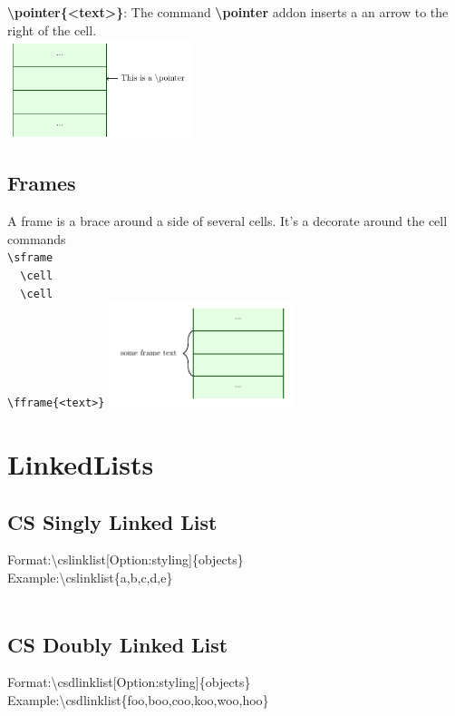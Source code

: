 \documentclass[a4paper]{article}
\begin{document}
\textbf{\textbackslash pointer\{\textless text\textgreater\}}: The command \textbf{\textbackslash pointer} addon inserts a an arrow to the right of the cell.
\vspace{3mm}\\
\includegraphics[width=0.4\textwidth]{stack_pointer.png}\\
\subsection{Frames}
A frame is a brace around a side of several cells. It's a decorate around the cell commands\\
\verb!\sframe!\\
\verb!  \cell!\\
\verb!  \cell!\\
\verb!\fframe{<text>}!
\includegraphics[width=0.4\textwidth]{stack_frame.png}

\section{LinkedLists}

\subsection{CS Singly Linked List}
Format:{\textbackslash}cslinklist[Option:styling]{\{}objects{\}}\\
Example:{\textbackslash}cslinklist{\{}a,b,c,d,e{\}} \newline \\
\begin{adjustbox}{width=0.5\paperwidth,center,keepaspectratio}
\end{adjustbox}\\
\subsection{CS Doubly Linked List}
Format:{\textbackslash}csdlinklist[Option:styling]{\{}objects{\}}\\
Example:{\textbackslash}csdlinklist{\{}foo,boo,coo,koo,woo,hoo{\}} \newline \\
\begin{adjustbox}{width=0.5\paperwidth,center,keepaspectratio}
\end{adjustbox}\\
\end{document}
